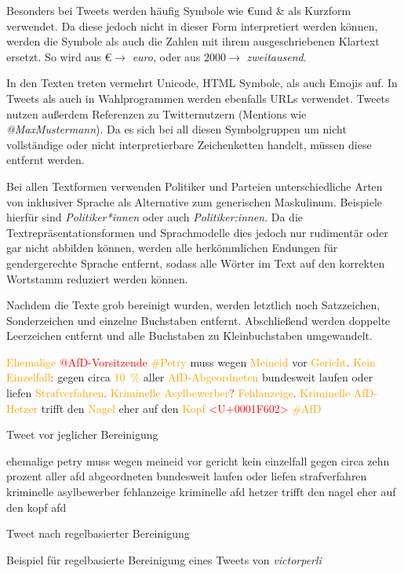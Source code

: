 Besonders bei Tweets werden häufig Symbole wie \euro und \& als Kurzform verwendet. Da diese jedoch nicht in dieser Form interpretiert werden können, werden die Symbole als auch die Zahlen mit ihrem ausgeschriebenen Klartext ersetzt. So wird aus \euro \(\rightarrow\) \textit{euro}, oder aus \(\num{2000} \rightarrow\) \textit{zweitausend}.

In den Texten treten vermehrt Unicode, \ac{HTML} Symbole, als auch Emojis auf. In Tweets als auch in Wahlprogrammen werden ebenfalls \acp{URL} verwendet. Tweets nutzen außerdem Referenzen zu Twitternutzern (Mentions wie \textit{@MaxMustermann}). Da es sich bei all diesen Symbolgruppen um nicht vollständige oder nicht interpretierbare Zeichenketten handelt, müssen diese entfernt werden.

Bei allen Textformen verwenden Politiker und Parteien unterschiedliche Arten von inklusiver Sprache als Alternative zum generischen Maskulinum. Beispiele hierfür sind \textit{Politiker*innen} oder auch \textit{Politiker:innen}. Da die Textrepräsentationsformen und Sprachmodelle dies jedoch nur rudimentär oder gar nicht abbilden können, werden alle herkömmlichen Endungen für gendergerechte Sprache entfernt, sodass alle Wörter im Text auf den korrekten Wortstamm reduziert werden können.

Nachdem die Texte grob bereinigt wurden, werden letztlich noch Satzzeichen, Sonderzeichen und einzelne Buchstaben entfernt. Abschließend werden doppelte Leerzeichen entfernt und alle Buchstaben zu Kleinbuchstaben umgewandelt.


\begin{code}[H]
    \begin{subcode}{0.45\textwidth}
        \small
        \textcolor{orange}{Ehemalige} \textcolor{red}{@AfD-Vorsitzende} \textcolor{orange}{\#Petry} muss wegen \textcolor{orange}{Meineid} vor \textcolor{orange}{Gericht}\textcolor{red}{.} \textcolor{orange}{Kein Einzelfall}\textcolor{red}{:} gegen circa \textcolor{orange}{\SI{10}{\percent}} aller \textcolor{orange}{AfD-Abgeordneten} bundesweit laufen oder liefen \textcolor{orange}{Strafverfahren}\textcolor{red}{.} \textcolor{orange}{Kriminelle Asylbewerber}\textcolor{red}{?} \textcolor{orange}{Fehlanzeige}\textcolor{red}{.} \textcolor{orange}{Kriminelle AfD-Hetzer} trifft den \textcolor{orange}{Nagel} eher auf den \textcolor{orange}{Kopf} \textcolor{red}{<U+0001F602>} \textcolor{orange}{\#AfD}
        \caption{Tweet vor jeglicher Bereinigung}
    \end{subcode}\hfill
    \begin{subcode}{0.45\textwidth}
        \small
        ehemalige petry muss wegen meineid vor gericht kein einzelfall gegen circa zehn prozent aller afd abgeordneten bundesweit laufen oder liefen strafverfahren kriminelle asylbewerber fehlanzeige kriminelle afd hetzer trifft den nagel eher auf den kopf afd
        \caption{Tweet nach regelbasierter Bereinigung}
    \end{subcode}\hfill
    \caption[Beispiel -- Regelbasierte Bereinigung]{Beispiel für regelbasierte Bereinigung eines Tweets von \textit{victorperli}} \label{list:rulebasedCleaning}
\end{code}


